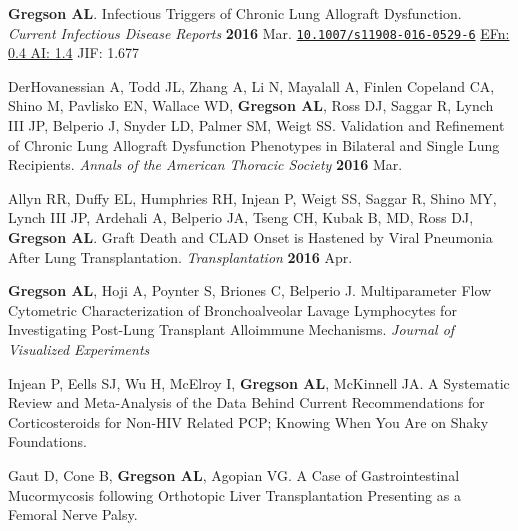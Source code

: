 \documentclass[letterpaper,11pt,sans,final]{moderncv}%
\begin{document}
 \vspace{0.2cm}
 \renewcommand{\refname}{Publications---Research Papers---Peer Reviewed ({\smaller in press})}
 \begin{thebibliography}{1}


  \bibitem[1]{} \textbf{Gregson AL}. Infectious Triggers of Chronic Lung Allograft Dysfunction. {\color{BrickRed}\textit{Current Infectious Disease Reports}} \textbf{2016} Mar. \href{}{\nolinkurl{10.1007/s11908-016-0529-6}}
{\color{NavyBlue}\href{http://52.6.43.8/projects/journalRank/rankings.php?bsearch=Current+Infectious+Disease+Reports&searchby=journal&orderby=eigenfactor}{{\smaller EFn: 0.4  AI: 1.4}}
       {\smaller JIF: 1.677}~
       }

  \bibitem[2]{} DerHovanessian A, Todd JL, Zhang A, Li N, Mayalall A, Finlen Copeland CA, Shino M, Pavlisko EN, Wallace WD, \textbf{Gregson AL}, Ross DJ, Saggar R, Lynch III JP, Belperio J, Snyder LD, Palmer SM, Weigt SS. Validation and Refinement of Chronic Lung Allograft Dysfunction Phenotypes in Bilateral and Single Lung Recipients. {\color{BrickRed}\textit{Annals of the American Thoracic Society}} \textbf{2016} Mar.

  \bibitem[3]{} Allyn RR, Duffy EL, Humphries RH, Injean P, Weigt SS, Saggar R, Shino MY, Lynch III JP, Ardehali A, Belperio JA, Tseng CH, Kubak B, MD, Ross DJ, \textbf{Gregson AL}. Graft Death and CLAD Onset is Hastened by Viral Pneumonia After Lung Transplantation. {\color{BrickRed}\textit{Transplantation}} \textbf{2016} Apr.

 \end{thebibliography}

\vspace{0.2cm}
\renewcommand{\refname}{Publications---Research Papers---Peer Reviewed ({\smaller Submitted})}
\begin{thebibliography}{1}
  \bibitem[1]{} \textbf{Gregson AL}, Hoji A, Poynter S, Briones C, Belperio J. Multiparameter Flow Cytometric Characterization of Bronchoalveolar Lavage Lymphocytes for Investigating Post-Lung Transplant Alloimmune Mechanisms. {\color{BrickRed}\textit{Journal of Visualized Experiments}}

  \bibitem[2]{} Injean P, Eells SJ, Wu H, McElroy I, \textbf{Gregson AL}, McKinnell JA. A Systematic Review and Meta-Analysis of the Data Behind Current Recommendations for Corticosteroids for Non-HIV Related PCP; Knowing When You Are on Shaky Foundations.

  \bibitem[3]{} Gaut D, Cone B, \textbf{Gregson AL}, Agopian VG. A Case of Gastrointestinal Mucormycosis following Orthotopic Liver Transplantation Presenting as a Femoral Nerve Palsy.

\end{thebibliography}
\end{document}
